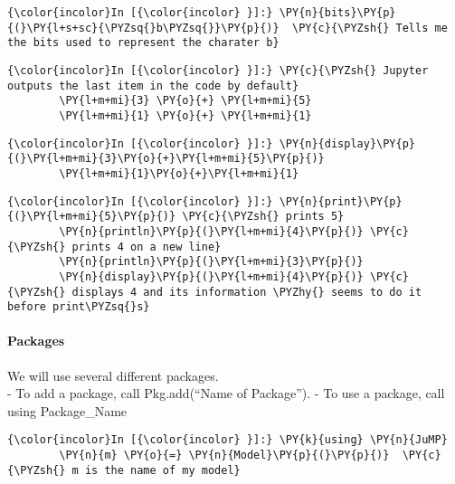     \begin{Verbatim}[commandchars=\\\{\}]
{\color{incolor}In [{\color{incolor} }]:} \PY{n}{bits}\PY{p}{(}\PY{l+s+sc}{\PYZsq{}b\PYZsq{}}\PY{p}{)}  \PY{c}{\PYZsh{} Tells me the bits used to represent the charater b}
\end{Verbatim}


    \begin{Verbatim}[commandchars=\\\{\}]
{\color{incolor}In [{\color{incolor} }]:} \PY{c}{\PYZsh{} Jupyter outputs the last item in the code by default}
        \PY{l+m+mi}{3} \PY{o}{+} \PY{l+m+mi}{5}
        \PY{l+m+mi}{1} \PY{o}{+} \PY{l+m+mi}{1}
\end{Verbatim}


    \begin{Verbatim}[commandchars=\\\{\}]
{\color{incolor}In [{\color{incolor} }]:} \PY{n}{display}\PY{p}{(}\PY{l+m+mi}{3}\PY{o}{+}\PY{l+m+mi}{5}\PY{p}{)}
        \PY{l+m+mi}{1}\PY{o}{+}\PY{l+m+mi}{1}
\end{Verbatim}


    \begin{Verbatim}[commandchars=\\\{\}]
{\color{incolor}In [{\color{incolor} }]:} \PY{n}{print}\PY{p}{(}\PY{l+m+mi}{5}\PY{p}{)} \PY{c}{\PYZsh{} prints 5}
        \PY{n}{println}\PY{p}{(}\PY{l+m+mi}{4}\PY{p}{)} \PY{c}{\PYZsh{} prints 4 on a new line}
        \PY{n}{println}\PY{p}{(}\PY{l+m+mi}{3}\PY{p}{)}
        \PY{n}{display}\PY{p}{(}\PY{l+m+mi}{4}\PY{p}{)} \PY{c}{\PYZsh{} displays 4 and its information \PYZhy{} seems to do it before print\PYZsq{}s}
\end{Verbatim}


    \hypertarget{packages}{%
\paragraph{Packages}
\label{packages}}

We will use several different packages.\\
- To add a package, call Pkg.add(``Name of Package''). - To use a
package, call using Package\_Name

    \begin{Verbatim}[commandchars=\\\{\}]
{\color{incolor}In [{\color{incolor} }]:} \PY{k}{using} \PY{n}{JuMP}  
        \PY{n}{m} \PY{o}{=} \PY{n}{Model}\PY{p}{(}\PY{p}{)}  \PY{c}{\PYZsh{} m is the name of my model}
\end{Verbatim}


